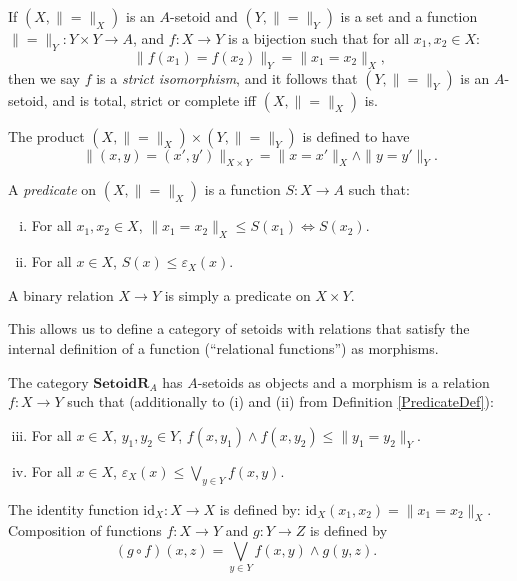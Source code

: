 \documentclass{lmcs}
\newcommand{\cat}[1]{\ensuremath{\mathbf{#1}}}
\newcommand{\id}{\ensuremath{\mathrm{id}}}
\newcommand{\beq}{\|\mbox{$=$}\|}
\newcommand{\inn}{\varepsilon}
\newcommand{\SetoidR}{\cat{SetoidR}}
\begin{document}
\begin{defi}
	\label{StrictIsoDef}
	If $(X,\beq_X)$ is an $A$-setoid and $(Y,\beq_Y)$ is a set and a function $\beq_Y : Y \times Y \rightarrow A$, and $f : X \rightarrow Y$ is a bijection such that for all $x_1, x_2 \in X$:
	$$
	\| f(x_1) = f(x_2) \|_Y = \| x_1 = x_2 \|_X,
	$$
	then we say $f$ is a \emph{strict isomorphism}, and it follows that $(Y,\beq_Y)$ is an $A$-setoid, and is total, strict or complete iff $(X,\beq_X)$ is.
\end{defi}

\begin{defi}
	\label{ProductSetoidDef}
	The product $(X,\beq_X) \times (Y,\beq_Y)$ is defined to have
	\[
	\| (x,y) = (x',y') \|_{X \times Y} = \| x = x' \|_X \land \| y = y' \|_Y.
	\]
\qedhere
\end{defi}

\begin{defi}
	\label{PredicateDef}
	A \emph{predicate} on $(X,\beq_X)$ is a function $S : X \rightarrow A$ such that:
	\begin{enumerate}[(i)]
		\item For all $x_1, x_2 \in X$, $\| x_1 = x_2 \|_X \leq S(x_1) \Leftrightarrow S(x_2)$. 
		\item For all $x \in X$, $S(x) \leq \inn_X(x)$.
	\end{enumerate}
A binary relation $X \rightarrow Y$ is simply a predicate on $X \times Y$. \qedhere
\end{defi}
This allows us to define a category of setoids with relations that satisfy the internal definition of a function (``relational functions'') as morphisms. 
\begin{defi}
	\label{SetoidRelDef}
	The category $\SetoidR_A$ has $A$-setoids as objects and a morphism is a relation $f: X \rightarrow Y$ such that (additionally to (i) and (ii) from Definition \ref{PredicateDef}):
 \begin{enumerate}[(i)]
		\setcounter{enumi}{2}
		\item For all $x \in X$, $y_1,y_2 \in Y$, $f(x,y_1) \land f(x,y_2) \leq \| y_1 = y_2 \|_Y$. 
		\item For all $x \in X$, $\inn_X(x) \leq \bigvee_{y \in Y} f(x,y)$. 
	\end{enumerate}
	The identity function $\id_X : X \rightarrow X$ is defined by:
	$
	\id_X(x_1,x_2) = \| x_1 = x_2\|_X.
	$
	\\ Composition of functions $f : X \rightarrow Y$ and $g : Y \rightarrow Z$ is defined by
	\[
	(g \circ f)(x,z) = \bigvee_{y \in Y} f(x,y) \land g(y,z). \qquad 
	\]
\qedhere
\end{defi}
\end{document}
